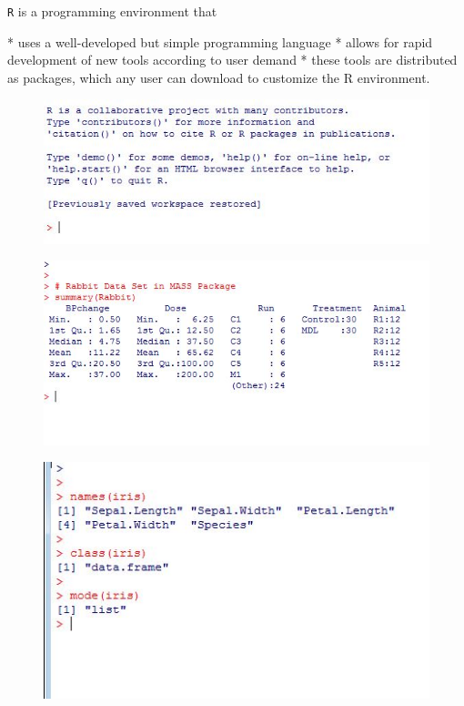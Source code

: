 \documentclass{beamer}
\begin{document}
 
 
 
 \texttt{R} is a programming environment that
 
 *  uses a well-developed but simple programming language
 *  allows for rapid development of new tools according to user demand
 *  these tools are distributed as packages, which any user can download to customize the R
 environment.

 
 
 
 
 \begin{figure}
 \centering
 \includegraphics[width=0.7\linewidth]{images/Rhelpcommands}
 \end{figure}
    
 
 
 \begin{figure}
 \centering
 \includegraphics[width=0.7\linewidth]{images/rabbitsummary}   
 \end{figure}
  
 
 
 
 \begin{figure}  
 \includegraphics[width=0.7\linewidth]{images/irisinspect}     
 \end{figure}
    
\end{document}

